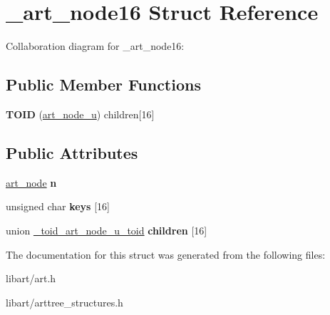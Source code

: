 \hypertarget{struct__art__node16}{}\section{\+\_\+art\+\_\+node16 Struct Reference}
\label{struct__art__node16}


Collaboration diagram for \+\_\+art\+\_\+node16\+:
\subsection*{Public Member Functions}
\begin{DoxyCompactItemize}
\item 
\mbox{\label{struct__art__node16_a94c28b57dd8cc192ec20756e78cb8c89}} 
{\bfseries T\+O\+ID} (\hyperlink{struct__art__node__u}{art\+\_\+node\+\_\+u}) children\mbox{[}16\mbox{]}
\end{DoxyCompactItemize}
\subsection*{Public Attributes}
\begin{DoxyCompactItemize}
\item 
\mbox{\label{struct__art__node16_afae26149cdfd134b5ded76b7e4fab889}} 
\hyperlink{struct__art__node}{art\+\_\+node} {\bfseries n}
\item 
\mbox{\label{struct__art__node16_a2df42019d4a87b03eb0331a309497247}} 
unsigned char {\bfseries keys} \mbox{[}16\mbox{]}
\item 
\mbox{\label{struct__art__node16_a231efc93632d538fb3ab3134dde8f194}} 
union \hyperlink{union__toid__art__node__u__toid}{\+\_\+toid\+\_\+art\+\_\+node\+\_\+u\+\_\+toid} {\bfseries children} \mbox{[}16\mbox{]}
\end{DoxyCompactItemize}


The documentation for this struct was generated from the following files\+:\begin{DoxyCompactItemize}
\item 
libart/art.\+h\item 
libart/arttree\+\_\+structures.\+h\end{DoxyCompactItemize}
